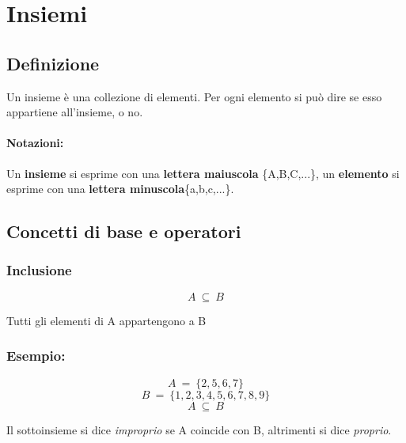 \section{Insiemi}
    \subsection{Definizione}
        Un insieme è una collezione di elementi. Per ogni elemento si può dire se esso appartiene all'insieme, o no.
    \paragraph{Notazioni:}Un \textbf{insieme} si esprime con una \textbf{lettera maiuscola} \{A,B,C,...\}, 
        un \textbf{elemento} si esprime con una \textbf{lettera minuscola}\{a,b,c,...\}.

    \subsection{Concetti di base e operatori}
    \subsubsection{Inclusione}
        \begin{LARGE}
            \begin{equation*}
                A\ \subseteq\ B
            \end{equation*}
        \end{LARGE}
        Tutti gli elementi di A appartengono a B\newline
        
        \subsubsection*{Esempio:}
        
        \begin{LARGE}
            \begin{equation*}
                A\ =\ \{2,5,6,7\}
            \end{equation*}
            \begin{equation*}
                B\ =\ \{1,2,3,4,5,6,7,8,9\}
            \end{equation*}
            \begin{equation*}
                A\ \subseteq\ B
            \end{equation*}
        \end{LARGE}
        Il sottoinsieme si dice \textit{improprio} se A coincide con B, altrimenti si dice \textit{proprio}.

